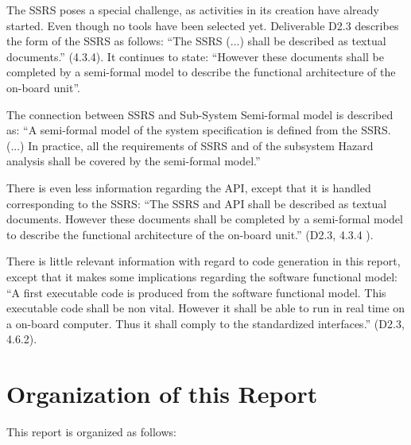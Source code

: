 The SSRS poses a special challenge, as activities in its creation have already started.  Even though no tools have been selected yet.  Deliverable D2.3 \citep{D2_3} describes the form of the SSRS as follows:
``The SSRS (...) shall be described as textual documents.'' (4.3.4).  It continues to state: ``However these documents shall be completed by a semi-formal model to describe the functional architecture of the on-board unit''.

The connection between SSRS and Sub-System Semi-formal model is described as: ``A semi-formal model of the system specification is defined from the SSRS. (...) In practice, all the requirements of SSRS and of the subsystem Hazard analysis shall be covered by the semi-formal model.''

There is even less information regarding the API, except that it is handled corresponding to the SSRS: ``The SSRS and API shall be described as textual documents. However these documents shall be completed by a semi-formal model to describe the functional architecture of the on-board unit.'' (D2.3, 4.3.4 \citep{D2_3}).

There is little relevant information with regard to code generation in this report, except that it makes some implications regarding the software functional model: ``A first executable code is produced from the software functional model.  This executable code shall be non vital. However it shall be able to run in real time on a on-board computer.  Thus it shall comply to the standardized interfaces.'' (D2.3, 4.6.2).

\section{Organization of this Report}

This report is organized as follows:

